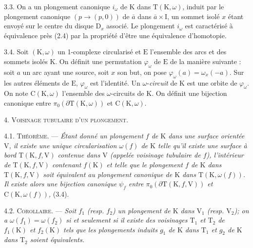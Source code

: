 3.3. On a un plongement canonique \(i_\omega\) de \(\mathrm{K}\) dans \(\mathrm{T}(\mathrm{K},\omega)\), induit par le plongement canonique \((p\to(p,0))\) de \(\bar a\) dans \(\bar a\times\mathrm{I}\), un sommet isolé \(x\) étant envoyé sur le centre du disque \(\mathrm{D}_x\) associé. Le plongement \(i_\omega\) est caractérisé à équivalence près (2.4) par la propriété d'être une équivalence d'homotopie.

3.4. Soit \((\mathrm{K},\omega)\) un 1-complexe circularisé et \(\mathrm{E}\) l'ensemble des arcs et des sommets isolés \(\mathrm{K}\). On définit une permutation \(\varphi_\omega\) de \(\mathrm{E}\) de la manière suivante : soit \(a\) un arc ayant une source, soit \(x\) son but, on pose \(\varphi_\omega(a)=\omega_x(-a)\). Sur les autres éléments de \(\mathrm{E}\), \(\varphi_\omega\) est l'identité. Un \(\omega\)-\textit{circuit} de \(\mathrm{K}\) est une orbite de \(\varphi_\omega\). On note \(\mathrm{C}(\mathrm{K},\omega)\) l'ensemble des \(\omega\)-circuits de \(\mathrm{K}\). On définit une bijection canonique entre \(\pi_0(\partial\mathrm{T}(\mathrm{K},\omega))\) et \(\mathrm{C}(\mathrm{K},\omega)\).

4. \textsc{Voisinage tubulaire d'un plongement.}

4.1. \textsc{Théorème.} --- \textit{Étant donné un plongement \(f\) de \(\mathrm{K}\) dans une surface orientée \(\mathrm{V}\), il existe une unique circularisation \(\omega(f)\) de \(\mathrm{K}\) telle qu'il existe une surface à bord \(\mathrm{T}(\mathrm{K},f,\mathrm{V})\) contenue dans \(\mathrm{V}\) (appelée \textup{voisinage tubulaire de} \(f\)), l'intérieur de \(\mathrm{T}(\mathrm{K},f,\mathrm{V})\) contenant \(f(\mathrm{K})\) et telle que le plongement \(f\) de \(\mathrm{K}\) dans \(\mathrm{T}(\mathrm{K},f,\mathrm{V})\) soit équivalent au plongement canonique de \(\mathrm{K}\) dans \(\mathrm{T}(\mathrm{K},\omega(f))\). Il existe alors une bijection canonique \(\psi_f\) entre \(\pi_0(\partial\mathrm{T}(\mathrm{K},f,\mathrm{V}))\) et \(\mathrm{C}(\mathrm{K},\omega(f))\),} (3.4).

4.2. \textsc{Corollaire.} --- \textit{Soit \(f_1\) (resp. \(f_2\)) un plongement de \(\mathrm{K}\) dans \(\mathrm{V}_1\) (resp. \(\mathrm{V}_2\)); on a \(\omega(f_1)=\omega(f_2)\) si et seulement si il existe des voisinages \(\mathrm{T}_1\) et \(\mathrm{T}_2\) de \(f_1(\mathrm{K})\) et \(f_2(\mathrm{K})\) tels que les plongements induits \(g_1\) de \(\mathrm{K}\) dans \(\mathrm{T}_1\) et \(g_2\) de \(\mathrm{K}\) dans \(\mathrm{T}_2\) soient équivalents.}

